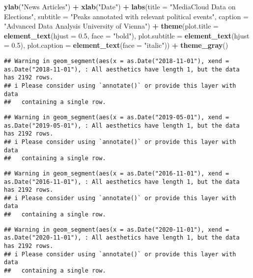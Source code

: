 \documentclass[
]{article}
\newenvironment{Shaded}{\begin{snugshade}}{\end{snugshade}}
\newcommand{\AttributeTok}[1]{\textcolor[rgb]{0.13,0.29,0.53}{#1}}
\newcommand{\FloatTok}[1]{\textcolor[rgb]{0.00,0.00,0.81}{#1}}
\newcommand{\FunctionTok}[1]{\textcolor[rgb]{0.13,0.29,0.53}{\textbf{#1}}}
\newcommand{\NormalTok}[1]{#1}
\newcommand{\SpecialCharTok}[1]{\textcolor[rgb]{0.81,0.36,0.00}{\textbf{#1}}}
\newcommand{\StringTok}[1]{\textcolor[rgb]{0.31,0.60,0.02}{#1}}
\begin{document}
\begin{Shaded}
\begin{Highlighting}[]
  \FunctionTok{ylab}\NormalTok{(}\StringTok{"News Articles"}\NormalTok{) }\SpecialCharTok{+}
  \FunctionTok{xlab}\NormalTok{(}\StringTok{"Date"}\NormalTok{) }\SpecialCharTok{+}
  \FunctionTok{labs}\NormalTok{(}\AttributeTok{title =} \StringTok{"MediaCloud Data on Elections"}\NormalTok{,}
       \AttributeTok{subtitle =} \StringTok{"Peaks annotated with relevant political events"}\NormalTok{,}
       \AttributeTok{caption =} \StringTok{"Advanced Data Analysis}
\StringTok{                  University of Vienna"}\NormalTok{) }\SpecialCharTok{+}
  \FunctionTok{theme}\NormalTok{(}\AttributeTok{plot.title =} \FunctionTok{element\_text}\NormalTok{(}\AttributeTok{hjust =} \FloatTok{0.5}\NormalTok{, }\AttributeTok{face =} \StringTok{"bold"}\NormalTok{),}
        \AttributeTok{plot.subtitle =} \FunctionTok{element\_text}\NormalTok{(}\AttributeTok{hjust =} \FloatTok{0.5}\NormalTok{),}
        \AttributeTok{plot.caption =} \FunctionTok{element\_text}\NormalTok{(}\AttributeTok{face =} \StringTok{"italic"}\NormalTok{)) }\SpecialCharTok{+}
  \FunctionTok{theme\_gray}\NormalTok{()}
\end{Highlighting}
\end{Shaded}

\begin{verbatim}
## Warning in geom_segment(aes(x = as.Date("2018-11-01"), xend = as.Date("2018-11-01"), : All aesthetics have length 1, but the data has 2192 rows.
## i Please consider using `annotate()` or provide this layer with data
##   containing a single row.
\end{verbatim}

\begin{verbatim}
## Warning in geom_segment(aes(x = as.Date("2019-05-01"), xend = as.Date("2019-05-01"), : All aesthetics have length 1, but the data has 2192 rows.
## i Please consider using `annotate()` or provide this layer with data
##   containing a single row.
\end{verbatim}

\begin{verbatim}
## Warning in geom_segment(aes(x = as.Date("2016-11-01"), xend = as.Date("2016-11-01"), : All aesthetics have length 1, but the data has 2192 rows.
## i Please consider using `annotate()` or provide this layer with data
##   containing a single row.
\end{verbatim}

\begin{verbatim}
## Warning in geom_segment(aes(x = as.Date("2020-11-01"), xend = as.Date("2020-11-01"), : All aesthetics have length 1, but the data has 2192 rows.
## i Please consider using `annotate()` or provide this layer with data
##   containing a single row.
\end{verbatim}
\end{document}
